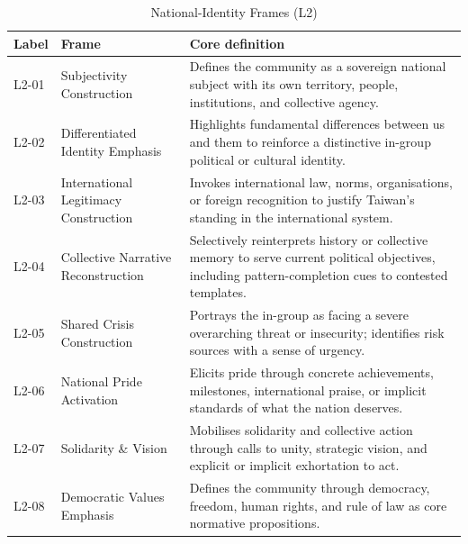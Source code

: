 \documentclass[man,12pt]{apa7}
\begin{document}
\begin{table}
\centering
\scriptsize
\caption{National-Identity Frames (L2)}
\label{tab:national-identity-frames}
\begin{tabularx}{\textwidth}{l l X}
\toprule
Label & Frame & Core definition \\
\midrule
L2-01 & Subjectivity Construction & Defines the community as a sovereign national subject with its own territory, people, institutions, and collective agency. \\
L2-02 & Differentiated Identity Emphasis & Highlights fundamental differences between us and them to reinforce a distinctive in-group political or cultural identity. \\
L2-03 & International Legitimacy Construction & Invokes international law, norms, organisations, or foreign recognition to justify Taiwan's standing in the international system. \\
L2-04 & Collective Narrative Reconstruction & Selectively reinterprets history or collective memory to serve current political objectives, including pattern-completion cues to contested templates. \\
L2-05 & Shared Crisis Construction & Portrays the in-group as facing a severe overarching threat or insecurity; identifies risk sources with a sense of urgency. \\
L2-06 & National Pride Activation & Elicits pride through concrete achievements, milestones, international praise, or implicit standards of what the nation deserves. \\
L2-07 & Solidarity \& Vision & Mobilises solidarity and collective action through calls to unity, strategic vision, and explicit or implicit exhortation to act. \\
L2-08 & Democratic Values Emphasis & Defines the community through democracy, freedom, human rights, and rule of law as core normative propositions. \\
\bottomrule
\end{tabularx}
\end{table}
\end{document}

